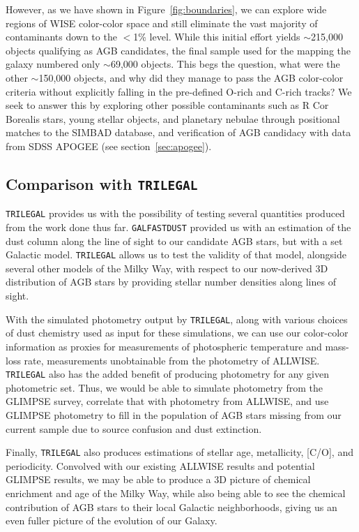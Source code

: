  However, as we have shown in Figure~\ref{fig:boundaries}, we can explore wide regions of WISE color-color space and still eliminate the vast majority of contaminants down to the $<$1\% level. While this initial effort yields $\sim$215,000 objects qualifying as AGB candidates, the final sample used for the mapping the galaxy numbered only $\sim$69,000 objects. This begs the question, what were the other $\sim$150,000 objects, and why did they manage to pass the AGB color-color criteria without explicitly falling in the pre-defined O-rich and C-rich tracks? We seek to answer this by exploring other possible contaminants such as R Cor Borealis stars, young stellar objects, and planetary nebulae \citep{2002MNRAS.337..749J} through positional matches to the SIMBAD database, and verification of AGB candidacy with data from SDSS APOGEE (see section~\ref{sec:apogee}).

\subsection{Comparison with {\tt TRILEGAL}}
{\tt TRILEGAL} \citep{2005A&A...436..895G, 2007ASPC..378...20G} provides us with the possibility of testing several quantities produced from the work done thus far. {\tt GALFASTDUST} provided us with an estimation of the dust column along the line of sight to our candidate AGB stars, but with a set Galactic model. {\tt TRILEGAL}  allows us to test the validity of that model, alongside several other models of the Milky Way, with respect to our now-derived 3D distribution of AGB stars by providing stellar number densities along lines of sight.

With the simulated photometry output by {\tt TRILEGAL}, along with various choices of dust chemistry used as input for these simulations, we can use our color-color information as proxies for measurements of photospheric temperature and mass-loss rate, measurements unobtainable from the photometry of ALLWISE. {\tt TRILEGAL} also has the added benefit of producing photometry for any given photometric set. Thus, we would be able to simulate photometry from the GLIMPSE survey, correlate that with photometry from ALLWISE, and use GLIMPSE photometry to fill in the population of AGB stars missing from our current sample due to source confusion and dust extinction. 

Finally, {\tt TRILEGAL} also produces estimations of stellar age, metallicity, [C/O], and periodicity. Convolved with our existing ALLWISE results and potential GLIMPSE results, we may be able to produce a 3D picture of chemical enrichment and age of the Milky Way, while also being able to see the chemical contribution of AGB stars to their local Galactic neighborhoods, giving us an even fuller picture of the evolution of our Galaxy.

